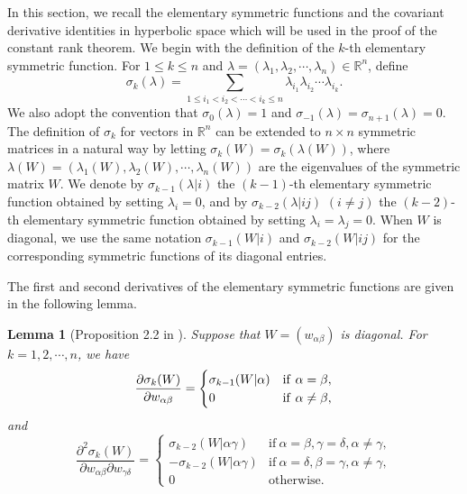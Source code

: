 \documentclass[11pt]{amsart}
\newtheorem{lemma}[theorem]{Lemma}
\numberwithin{theorem}{section}
\numberwithin{equation}{section}
\begin{document}
In this section, we recall the elementary symmetric functions and the covariant derivative identities in hyperbolic space which will be used in the proof of the constant rank theorem. We begin with the definition of the $k$-th elementary symmetric function. For $1\leq k\leq n$ and $\lambda=(\lambda_1,\lambda_2,\cdots,\lambda_n)\in\mathbb{R}^n$, define $$\sigma_k(\lambda)=\sum_{1\leq i_1<i_2<\cdots<i_k\leq n}\lambda_{i_1}\lambda_{i_2}\cdots\lambda_{i_k}.$$ We also adopt the convention that $\sigma_0(\lambda)=1$ and $\sigma_{-1}(\lambda)=\sigma_{n+1}(\lambda)=0$. The definition of $\sigma_k$ for vectors in $\mathbb{R}^n$ can be extended to $n\times n$ symmetric matrices in a natural way by letting $\sigma_k(W)=\sigma_k(\lambda(W))$, where $\lambda(W)=(\lambda_1(W),\lambda_2(W),\cdots,\lambda_n(W))$ are the eigenvalues of the symmetric matrix $W$. We denote by $\sigma_{k-1}(\lambda|i)$ the $(k-1)$-th elementary symmetric function obtained by setting $\lambda_i=0$, and by $\sigma_{k-2}(\lambda|ij)$ $(i\neq j)$ the $(k-2)$-th elementary symmetric function obtained by setting $\lambda_i=\lambda_j=0$. When $W$ is diagonal, we use the same notation $\sigma_{k-1}(W|i)$ and $\sigma_{k-2}(W|ij)$ for the corresponding symmetric functions of its diagonal entries.

The first and second derivatives of the elementary symmetric functions are given in the following lemma.
\begin{lemma}[Proposition 2.2 in \cite{Guan-Ma2003}]\label{Lemma-sigma_k}
Suppose that $W=(w_{\alpha\beta})$ is diagonal. For $k=1,2,\cdots,n$, we have
\begin{equation}\label{Equality-sigma_{k-1}}
\frac{\partial\sigma_k(W)}{\partial w_{\alpha\beta}}=\begin{cases}
\sigma_{k-1}(W|\alpha) & \mathrm{if}\ \alpha=\beta,\\
0 & \mathrm{if}\ \alpha\neq\beta,
\end{cases}
\end{equation}
and $$\frac{\partial^2\sigma_k(W)}{\partial w_{\alpha\beta}\partial w_{\gamma\delta}}=\begin{cases}
\sigma_{k-2}(W|\alpha\gamma) & \mathrm{if}\ \alpha=\beta,\gamma=\delta,\alpha\neq\gamma,\\
-\sigma_{k-2}(W|\alpha\gamma) & \mathrm{if}\ \alpha=\delta,\beta=\gamma,\alpha\neq\gamma,\\
0 & \mathrm{otherwise}.
\end{cases}$$
\end{lemma}
\end{document}
